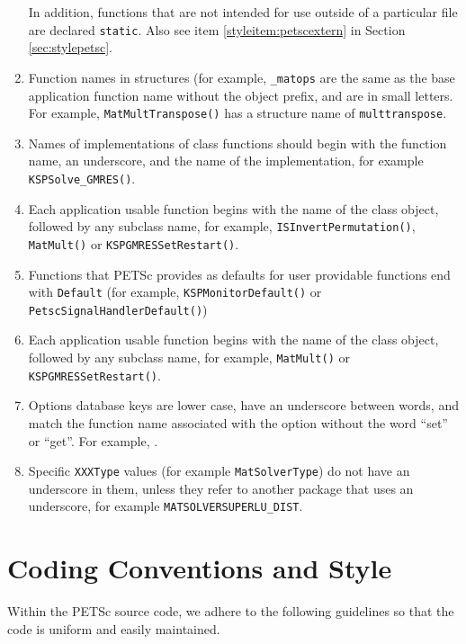 \begin{enumerate}
      In addition, functions that are not intended for use outside
      of a particular file are declared \lstinline{static}.
      Also see item \ref{styleitem:petscextern} in Section \ref{sec:stylepetsc}.
\item Function names in structures (for example, \lstinline{_matops} are the same as the base application
      function name without the object prefix, and are in small letters.
      For example, \lstinline{MatMultTranspose()} has a structure name of
      \lstinline{multtranspose}.
\item Names of implementations of class functions should begin with the function name, an underscore, and the name of the implementation, for example \lstinline{KSPSolve_GMRES()}.
\item Each application usable function begins with the name of the class object, followed by any subclass name,
  for example, \lstinline{ISInvertPermutation()}, \lstinline{MatMult()} or \lstinline{KSPGMRESSetRestart()}.
\item Functions that PETSc provides as defaults for user providable functions end with \lstinline{Default} (for example, \lstinline{KSPMonitorDefault()} or \lstinline{PetscSignalHandlerDefault()})
\item Each application usable function begins with the name of the class object, followed by any subclass name,
  for example,  \lstinline{MatMult()} or \lstinline{KSPGMRESSetRestart()}.
\item Options database keys are lower case, have an underscore between words, and match the function name associated with the option without the word ``set'' or ``get''.
For example, .
\item Specific \lstinline{XXXType} values (for example \lstinline{MatSolverType}) do not have an underscore in them, unless they refer to another package that uses an underscore, for example \lstinline{MATSOLVERSUPERLU_DIST}.
\end{enumerate}

\section{Coding Conventions and Style}
Within the PETSc source code, we adhere to the following guidelines
so that the code is uniform and easily maintained.

